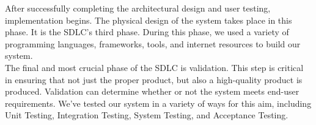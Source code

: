 After successfully completing the architectural design and user testing, implementation begins. The physical design of the system takes place in this phase. It is the SDLC's third phase. During this phase, we used a variety of programming languages, frameworks, tools, and internet resources to build our system.\\

The final and most crucial phase of the SDLC is validation. This step is critical in ensuring that not just the proper product, but also a high-quality product is produced. Validation can determine whether or not the system meets end-user requirements. We've tested our system in a variety of ways for this aim, including Unit Testing, Integration Testing, System Testing, and Acceptance Testing.

